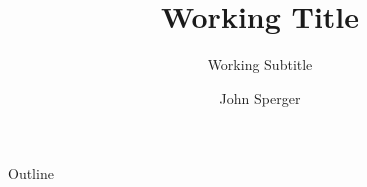 \documentclass[aspectratio=169, professionalfonts]{beamer}
\author{John Sperger}
\date{}
\title{Working Title}
\subtitle{Working Subtitle}
\begin{document}
\maketitle
\begin{frame}{Outline}
	\tableofcontents[hideallsubsections]
\end{frame}
\end{document}
